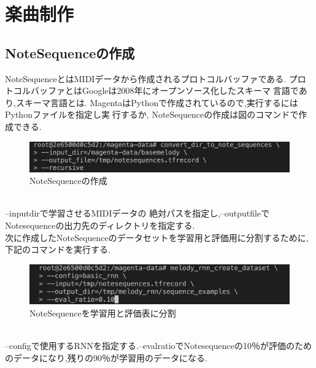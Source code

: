 \chapter{楽曲制作}
\section{NoteSequenceの作成}
NoteSequenceとはMIDIデータから作成されるプロトコルバッファである.
プロトコルバッファとはGoogleは2008年にオープンソース化したスキーマ言語であり,スキーマ言語とは.
MagentaはPythonで作成されているので,実行するにはPythonファイルを指定し実行するか,
NoteSequenceの作成は図のコマンドで作成できる.
\begin{figure}[!ht]
    \begin{screen}
    \begin{center}
        \includegraphics[scale=0.7, clip]{./img/Notesequence_make.png}
        \caption{NoteSequenceの作成}
        \label{fig:NoteSequenceの作成}
    \end{center}
    \end{screen}
\end{figure} \\
--inputdirで学習させるMIDIデータの 絶対パスを指定し,--outputfileでNotesequenceの出力先のディレクトリを指定する.\\
次に作成したNoteSequenceのデータセットを学習用と評価用に分割するために,下記のコマンドを実行する.
\begin{figure}[!ht]
    \begin{screen}
    \begin{center}
        \includegraphics[scale=0.7, clip]{./img/Notesequence_split.png}
        \caption{NoteSequenceを学習用と評価表に分割}
        \label{fig:NoteSequenceを学習用と評価表に分割}
    \end{center}
    \end{screen}
\end{figure}\\
--configで使用するRNNを指定する.--evalratioでNotesequenceの10％が評価のためのデータになり,残りの90％が学習用のデータになる.\\
\newpage
